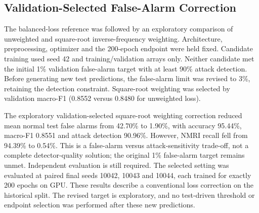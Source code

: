 \subsection{Validation-Selected False-Alarm Correction}
The balanced-loss reference was followed by an exploratory comparison of unweighted and square-root inverse-frequency weighting. Architecture, preprocessing, optimizer and the 200-epoch endpoint were held fixed. Candidate training used seed 42 and training/validation arrays only. Neither candidate met the initial 1\% validation false-alarm target with at least 90\% attack detection. Before generating new test predictions, the false-alarm limit was revised to 3\%, retaining the detection constraint. Square-root weighting was selected by validation macro-F1 (0.8552 versus 0.8480 for unweighted loss).

The exploratory validation-selected square-root weighting correction reduced mean normal test false alarms from 42.70\% to 1.90\%, with accuracy 95.44\%, macro-F1 0.8551 and attack detection 90.96\%. However, NMRI recall fell from 94.39\% to 0.54\%. This is a false-alarm versus attack-sensitivity trade-off, not a complete detector-quality solution; the original 1\% false-alarm target remains unmet. Independent evaluation is still required.
The selected setting was evaluated at paired final seeds 10042, 10043 and 10044, each trained for exactly 200 epochs on GPU. These results describe a conventional loss correction on the historical split. The revised target is exploratory, and no test-driven threshold or endpoint selection was performed after these new predictions.
